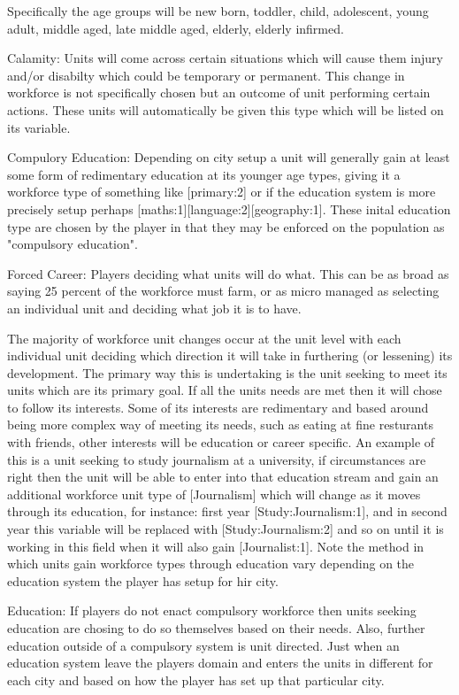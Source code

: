 Specifically the age groups will be new born, toddler, child, adolescent, young adult, middle aged, late middle aged, elderly, elderly infirmed. 

Calamity:
Units will come across certain situations which will cause them injury and/or disabilty which could be temporary or permanent. This change in workforce is not specifically chosen but an outcome of unit performing certain actions. These units will automatically be given this type which will be listed on its variable.  


Compulory Education:
Depending on city setup a unit will generally gain at least some form of redimentary education at its younger age types, giving it a workforce type of something like [primary:2] or if the education system is more precisely setup perhaps [maths:1][language:2][geography:1]. These inital education type are chosen by the player in that they may be enforced on the population as "compulsory education".

Forced Career:
Players deciding what units will do what. This can be as broad as saying 25 percent of the workforce must farm, or as micro managed as selecting an individual unit and deciding what job it is to have.


The majority of workforce unit changes occur at the unit level with each individual unit deciding which direction it will take in furthering (or lessening) its development. The primary way this is undertaking is the unit seeking to meet its units which are its primary goal. If all the units needs are met then it will chose to follow its interests. Some of its interests are redimentary and based around being more complex way of meeting its needs, such as eating at fine resturants with friends, other interests will be education or career specific. An example of this is a unit seeking to study journalism at a university, if circumstances are right then the unit will be able to enter into that education stream and gain an additional workforce unit type of [Journalism] which will change as it moves through its education, for instance: first year [Study:Journalism:1], and in second year this variable will be replaced with [Study:Journalism:2] and so on until it is working in this field when it will also gain [Journalist:1]. Note the method in which units gain workforce types through education vary depending on the education system the player has setup for hir city.

Education:
If players do not enact compulsory workforce then units seeking education are chosing to do so themselves based on their needs. Also, further education outside of a compulsory system is unit directed. Just when an education system leave the players domain and enters the units in different for each city and based on how the player has set up that particular city.

